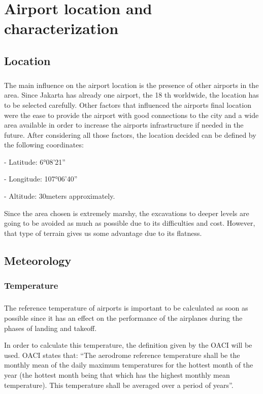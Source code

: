 \chapter{Airport location and characterization}
	\section{Location}
\paragraph{} The main influence on the airport location is the presence of other airports in the area. Since
Jakarta has already one airport, the 18 th worldwide, the location has to be selected carefully.
Other factors that influenced the airports final location were the ease to provide the airport
with good connections to the city and a wide area available in order to increase the airports
infrastructure if needed in the future.
After considering all those factors, the location decided can be defined by the following coordinates:

- Latitude: 6°08'21''

- Longitude: 107°06'40''

- Altitude: 30meters approximately.

Since the area chosen is extremely marshy, the excavations to deeper levels are going to be
avoided as much as possible due to its difficulties and cost. However, that type of terrain gives
us some advantage due to its flatness.
	\section{Meteorology}
		\subsection{Temperature}
		\paragraph{}The reference temperature of airports is important to be calculated as soon as possible since it has an effect on the performance of the airplanes during the phases of landing and takeoff. 
		
		In order to calculate this temperature, the definition given by the OACI will be used. OACI states that: “The aerodrome reference temperature shall be the monthly mean of the daily maximum temperatures for the hottest month of the year (the hottest month being that which has the highest monthly mean temperature). This temperature shall be averaged over a period of years”.
		
